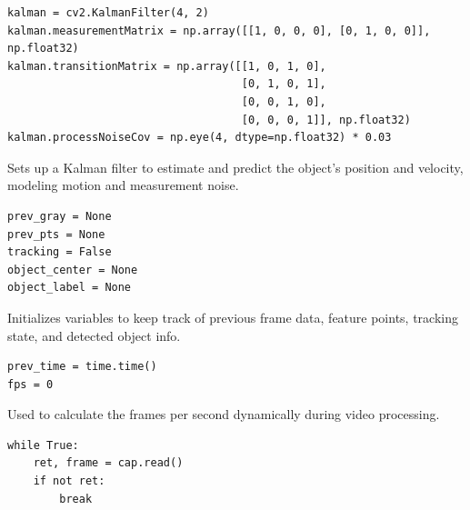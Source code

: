 \documentclass[a4paper,12pt]{article}
\begin{document}
\vspace{0.5em}
\begin{tcolorbox}[colback=lightgray!20, colframe=gray!80, title=Kalman Filter Initialization]
\begin{verbatim}
kalman = cv2.KalmanFilter(4, 2)
kalman.measurementMatrix = np.array([[1, 0, 0, 0], [0, 1, 0, 0]], np.float32)
kalman.transitionMatrix = np.array([[1, 0, 1, 0], 
                                    [0, 1, 0, 1], 
                                    [0, 0, 1, 0], 
                                    [0, 0, 0, 1]], np.float32)
kalman.processNoiseCov = np.eye(4, dtype=np.float32) * 0.03
\end{verbatim}
\end{tcolorbox}

Sets up a Kalman filter to estimate and predict the object’s position and velocity, modeling motion and measurement noise.

\vspace{0.5em}
\begin{tcolorbox}[colback=lightgray!20, colframe=gray!80, title=Tracking Variables Initialization]
\begin{verbatim}
prev_gray = None
prev_pts = None
tracking = False
object_center = None
object_label = None
\end{verbatim}
\end{tcolorbox}

Initializes variables to keep track of previous frame data, feature points, tracking state, and detected object info.

\vspace{0.5em}
\begin{tcolorbox}[colback=lightgray!20, colframe=gray!80, title=FPS Calculation Setup]
\begin{verbatim}
prev_time = time.time()
fps = 0
\end{verbatim}
\end{tcolorbox}

Used to calculate the frames per second dynamically during video processing.

\vspace{0.5em}
\begin{tcolorbox}[colback=lightgray!20, colframe=gray!80, title=Main Loop - Frame Processing]
\begin{verbatim}
while True:
    ret, frame = cap.read()
    if not ret:
        break
\end{verbatim}
\end{tcolorbox}
\end{document}
